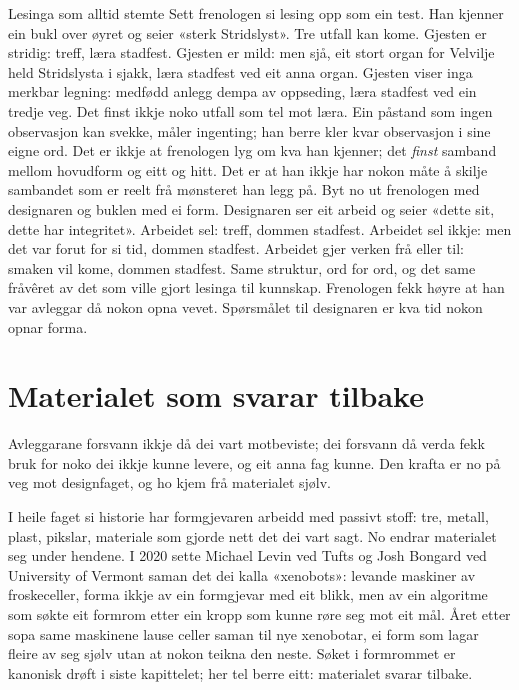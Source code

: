 \begin{kasus}{Lesinga som alltid stemte}
Sett frenologen si lesing opp som ein test. Han kjenner ein bukl over øyret og seier «sterk Stridslyst». Tre utfall kan kome. Gjesten er stridig: treff, læra stadfest. Gjesten er mild: men sjå, eit stort organ for Velvilje held Stridslysta i sjakk, læra stadfest ved eit anna organ. Gjesten viser inga merkbar legning: medfødd anlegg dempa av oppseding, læra stadfest ved ein tredje veg. Det finst ikkje noko utfall som tel mot læra. Ein påstand som ingen observasjon kan svekke, måler ingenting; han berre kler kvar observasjon i sine eigne ord. Det er ikkje at frenologen lyg om kva han kjenner; det \emph{finst} samband mellom hovudform og eitt og hitt. Det er at han ikkje har nokon måte å skilje sambandet som er reelt frå mønsteret han legg på. Byt no ut frenologen med designaren og buklen med ei form. Designaren ser eit arbeid og seier «dette sit, dette har integritet». Arbeidet sel: treff, dommen stadfest. Arbeidet sel ikkje: men det var forut for si tid, dommen stadfest. Arbeidet gjer verken frå eller til: smaken vil kome, dommen stadfest. Same struktur, ord for ord, og det same fråvêret av det som ville gjort lesinga til kunnskap. Frenologen fekk høyre at han var avleggar då nokon opna vevet. Spørsmålet til designaren er kva tid nokon opnar forma.
\end{kasus}

\section{Materialet som svarar tilbake}

Avleggarane forsvann ikkje då dei vart motbeviste; dei forsvann då verda fekk bruk for noko dei ikkje kunne levere, og eit anna fag kunne. Den krafta er no på veg mot designfaget, og ho kjem frå materialet sjølv.

I heile faget si historie har formgjevaren arbeidd med passivt stoff: tre, metall, plast, pikslar, materiale som gjorde nett det dei vart sagt. No endrar materialet seg under hendene. I 2020 sette Michael Levin ved Tufts og Josh Bongard ved University of Vermont saman det dei kalla «xenobots»: levande maskiner av froskeceller, forma ikkje av ein formgjevar med eit blikk, men av ein algoritme som søkte eit formrom etter ein kropp som kunne røre seg mot eit mål. Året etter sopa same maskinene lause celler saman til nye xenobotar, ei form som lagar fleire av seg sjølv utan at nokon teikna den neste. Søket i formrommet er kanonisk drøft i siste kapittelet; her tel berre eitt: materialet svarar tilbake.

